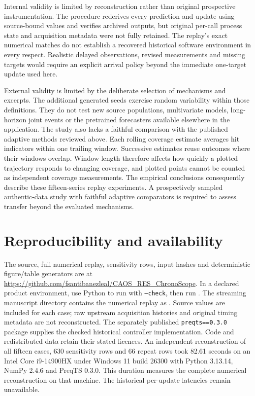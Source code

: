 \documentclass[11pt,a4paper]{article}
\begin{document}
Internal validity is limited by reconstruction rather than original prospective instrumentation. The procedure rederives every prediction and update using source-bound values and verifies archived outputs, but original per-call process state and acquisition metadata were not fully retained. The replay's exact numerical matches do not establish a recovered historical software environment in every respect. Realistic delayed observations, revised measurements and missing targets would require an explicit arrival policy beyond the immediate one-target update used here.

External validity is limited by the deliberate selection of mechanisms and excerpts. The additional generated seeds exercise random variability within those definitions. They do not test new source populations, multivariate models, long-horizon joint events or the pretrained forecasters available elsewhere in the application. The study also lacks a faithful comparison with the published adaptive methods reviewed above. Each rolling coverage estimate averages hit indicators within one trailing window. Successive estimates reuse outcomes where their windows overlap. Window length therefore affects how quickly a plotted trajectory responds to changing coverage, and plotted points cannot be counted as independent coverage measurements. The empirical conclusions consequently describe these fifteen-series replay experiments. A prospectively sampled authentic-data study with faithful adaptive comparators is required to assess transfer beyond the evaluated mechanisms.

\section{Reproducibility and availability}
The source, full numerical replay, sensitivity rows, input hashes and deterministic figure/table generators are at \url{https://github.com/fsantibanezleal/CAOS_RES_ChronoScope}. In a declared product environment, use Python to run  with \texttt{--check}, then run . The streaming manuscript directory contains the numerical replay as . Source values are included for each case; raw upstream acquisition histories and original timing metadata are not reconstructed. The separately published \texttt{preqts==0.3.0} package supplies the checked historical controller implementation. Code and redistributed data retain their stated licences. An independent reconstruction of all fifteen cases, 630 sensitivity rows and 66 repeat rows took 82.61 seconds on an Intel Core i9-14900HX under Windows 11 build 26300 with Python 3.13.14, NumPy 2.4.6 and PreqTS 0.3.0. This duration measures the complete numerical reconstruction on that machine. The historical per-update latencies remain unavailable.
\end{document}
